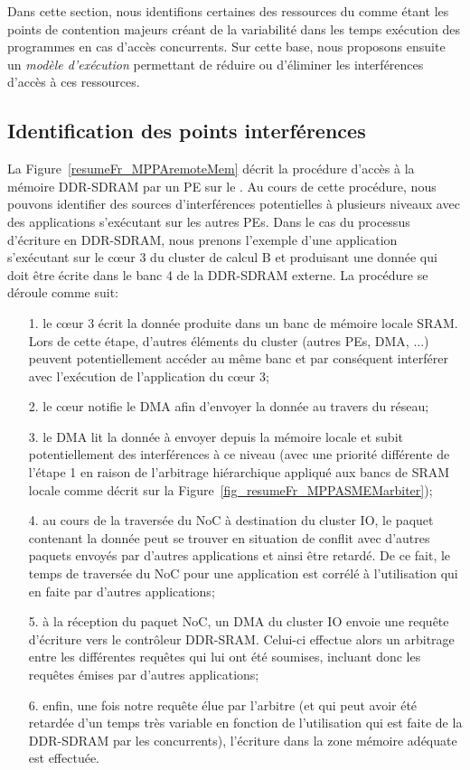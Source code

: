\documentclass[main.tex]{subfiles}
\begin{document}
Dans cette section, nous identifions certaines des ressources du \mppalong comme étant les points de contention majeurs créant de la variabilité dans les temps exécution des programmes en cas d'accès concurrents.  Sur cette base, nous proposons ensuite un \emph{modèle d'exécution} permettant de réduire ou d'éliminer les interférences d'accès à ces ressources.

\subsection{Identification des points interférences}
La Figure~\ref{resumeFr_MPPAremoteMem} décrit la procédure d'accès à la mémoire DDR-SDRAM par un PE sur le \mppalong. Au cours de cette procédure, nous pouvons identifier des sources d'interférences potentielles à plusieurs niveaux avec des applications s'exécutant sur les autres PEs. Dans le cas du processus d'écriture en DDR-SDRAM, nous prenons l'exemple d'une application s'exécutant sur le c\oe{}ur 3 du cluster de calcul B et produisant une donnée qui doit être écrite dans le banc 4 de la DDR-SDRAM externe. La procédure se déroule comme suit:
\begin{itemize}
    \item[1.] le c\oe{}ur 3 écrit la donnée produite dans un banc de mémoire locale SRAM. Lors de cette étape, d'autres éléments du cluster (autres PEs, DMA, ...) peuvent potentiellement accéder au même banc et par conséquent interférer avec l'exécution de l'application du c\oe{}ur 3;
    \item[2.] le c\oe{}ur notifie le DMA afin d'envoyer la donnée au travers du réseau;
    \item[3.] le DMA lit la donnée à envoyer depuis la mémoire locale et subit potentiellement des interférences à ce niveau (avec une priorité différente de l'étape 1 en raison de l'arbitrage hiérarchique appliqué aux bancs de SRAM locale comme décrit sur la Figure~\ref{fig_resumeFr_MPPASMEMarbiter});
    \item[4.] au cours de la traversée du NoC à destination du cluster IO, le paquet contenant la donnée peut se trouver en situation de conflit avec d'autres paquets envoyés par d'autres applications et ainsi être retardé. De ce fait, le temps de traversée du NoC pour une application est corrélé à l'utilisation qui en faite par d'autres applications;
    \item[5.] à la réception du paquet NoC, un DMA du cluster IO envoie une requête d'écriture vers le contrôleur DDR-SRAM. Celui-ci effectue alors un arbitrage entre les différentes requêtes qui lui ont été soumises, incluant donc les requêtes émises par d'autres applications;
    \item[6.] enfin, une fois notre requête élue par l'arbitre (et qui peut avoir été retardée d'un temps très variable en fonction de l'utilisation qui est faite de la DDR-SDRAM par les concurrents), l'écriture dans la zone mémoire adéquate est effectuée.
\end{itemize}
\end{document}
